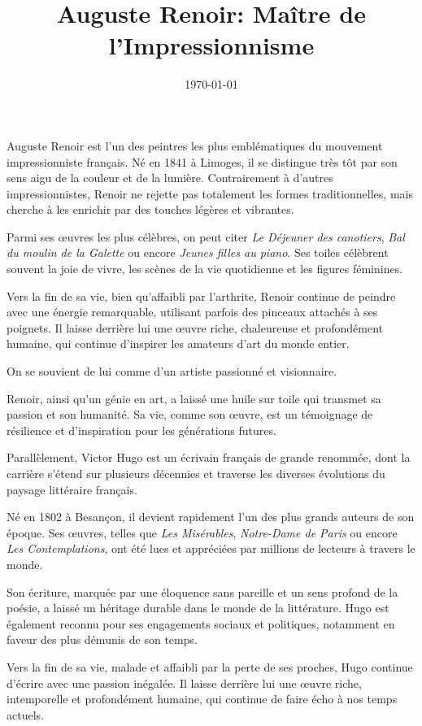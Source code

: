 \documentclass{article}
\title{Auguste Renoir: Maître de l’Impressionnisme}
\author{}
\date{\today}
\begin{document}
 
 
\maketitle

Auguste Renoir est l’un des peintres les plus emblématiques du mouvement impressionniste français. Né en 1841 à Limoges, il se distingue très tôt par son sens aigu de la couleur et de la lumière. Contrairement à d'autres impressionnistes, Renoir ne rejette pas totalement les formes traditionnelles, mais cherche à les enrichir par des touches légères et vibrantes. 

Parmi ses œuvres les plus célèbres, on peut citer \emph{Le Déjeuner des canotiers}, \emph{Bal du moulin de la Galette} ou encore \emph{Jeunes filles au piano}. Ses toiles célèbrent souvent la joie de vivre, les scènes de la vie quotidienne et les figures féminines.

Vers la fin de sa vie, bien qu'affaibli par l'arthrite, Renoir continue de peindre avec une énergie remarquable, utilisant parfois des pinceaux attachés à ses poignets. Il laisse derrière lui une œuvre riche, chaleureuse et profondément humaine, qui continue d’inspirer les amateurs d’art du monde entier.

On se souvient de lui comme d'un artiste passionné et visionnaire.

Renoir, ainsi qu'un génie en art, a laissé une huile sur toile qui transmet sa passion et son humanité. Sa vie, comme son œuvre, est un témoignage de résilience et d'inspiration pour les générations futures.

Parallèlement, Victor Hugo est un écrivain français de grande renommée, dont la carrière s'étend sur plusieurs décennies et traverse les diverses évolutions du paysage littéraire français.

Né en 1802 à Besançon, il devient rapidement l'un des plus grands auteurs de son époque. Ses œuvres, telles que \emph{Les Misérables}, \emph{Notre-Dame de Paris} ou encore \emph{Les Contemplations}, ont été lues et appréciées par millions de lecteurs à travers le monde.

Son écriture, marquée par une éloquence sans pareille et un sens profond de la poésie, a laissé un héritage durable dans le monde de la littérature. Hugo est également reconnu pour ses engagements sociaux et politiques, notamment en faveur des plus démunis de son temps.

Vers la fin de sa vie, malade et affaibli par la perte de ses proches, Hugo continue d'écrire avec une passion inégalée. Il laisse derrière lui une œuvre riche, intemporelle et profondément humaine, qui continue de faire écho à nos temps actuels.
\end{document}

